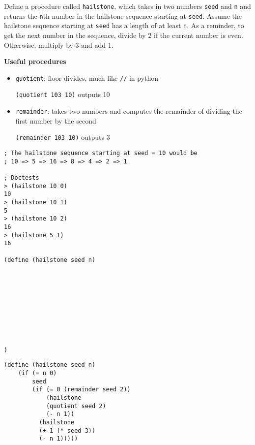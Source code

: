 \begin{blocksection}
\question Define a procedure called \lstinline$hailstone$,
which takes in two numbers \lstinline$seed$ and \lstinline$n$ and returns the
\lstinline$n$th number in the hailstone sequence starting at \lstinline$seed$.
Assume the hailstone sequence starting at \lstinline$seed$ has a length of at least
\lstinline$n$. As a reminder, to get the next number in the sequence, divide by $2$ if the current number is even. Otherwise, multiply by $3$ and add $1$.

\textbf{Useful procedures}

\begin{itemize}
\item \lstinline$quotient$: floor divides, much like \lstinline$//$ in python

\lstinline$(quotient 103 10)$ outputs 10

\item \lstinline$remainder$: takes two numbers and computes the remainder of dividing the first number by the second

\lstinline$(remainder 103 10)$ outputs 3
\end{itemize}

\vspace{\baselineskip}
\begin{lstlisting}
; The hailstone sequence starting at seed = 10 would be
; 10 => 5 => 16 => 8 => 4 => 2 => 1

; Doctests
> (hailstone 10 0)
10
> (hailstone 10 1)
5
> (hailstone 10 2)
16
> (hailstone 5 1)
16

(define (hailstone seed n)










)
\end{lstlisting}
\end{blocksection}

\begin{solution}[-32pt]
\begin{blocksection}
\begin{lstlisting}
(define (hailstone seed n)
    (if (= n 0)
        seed
        (if (= 0 (remainder seed 2))
            (hailstone
            (quotient seed 2)
            (- n 1))
          (hailstone
          (+ 1 (* seed 3))
          (- n 1)))))
\end{lstlisting}
\end{blocksection}
\end{solution}



